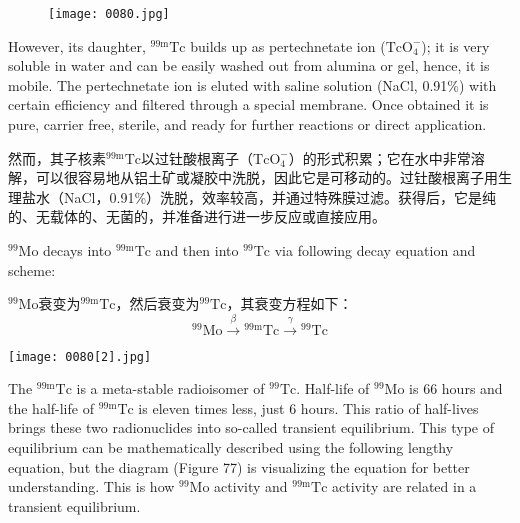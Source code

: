 \documentclass[dvipsnames, svgnames,a4paper,11pt]{article}
\begin{document}
\begin{figure}[ht]
    \centering
    \texttt{[image: 0080.jpg]}
     \label{fig76}
\end{figure}

However, its daughter, $^{99\text{m}}\text{Tc}$ builds up as pertechnetate ion ($\text{TcO}_4^{-}$); it is very soluble in water and can be easily washed out from alumina or gel, hence, it is mobile. The pertechnetate ion is eluted with saline solution (NaCl, 0.91\%) with certain efficiency and filtered through a special membrane. Once obtained it is pure, carrier free, sterile, and ready for further reactions or direct application.

然而，其子核素$^{99\text{m}}\text{Tc}$以过钍酸根离子（$\text{TcO}_4^{-}$）的形式积累；它在水中非常溶解，可以很容易地从铝土矿或凝胶中洗脱，因此它是可移动的。过钍酸根离子用生理盐水（NaCl，0.91\%）洗脱，效率较高，并通过特殊膜过滤。获得后，它是纯的、无载体的、无菌的，并准备进行进一步反应或直接应用。

$^{99}\text{Mo}$ decays into $^{99\text{m}}\text{Tc}$ and then into $^{99}\text{Tc}$ via following decay equation and scheme:  

$^{99}\text{Mo}$衰变为$^{99\text{m}}\text{Tc}$，然后衰变为$^{99}\text{Tc}$，其衰变方程如下：
$$^{99}\text{Mo} \xrightarrow{\beta} {}^{99\text{m}}\text{Tc} \xrightarrow{\gamma} {}^{99}\text{Tc}$$

\begin{figure*}[ht]
    \centering
    \texttt{[image: 0080[2].jpg]}
\end{figure*}


The $^{99\text{m}}\text{Tc}$ is a meta-stable radioisomer of $^{99}\text{Tc}$. Half-life of $^{99}\text{Mo}$ is 66 hours and the half-life of $^{99\text{m}}\text{Tc}$ is eleven times less, just 6 hours. This ratio of half-lives brings these two radionuclides into so-called transient equilibrium. This type of equilibrium can be mathematically described using the following lengthy equation, but the diagram (Figure 77) is visualizing the equation for better understanding. This is how $^{99}\text{Mo}$ activity and $^{99\text{m}}\text{Tc}$ activity are related in a transient equilibrium.
 
\end{document}
